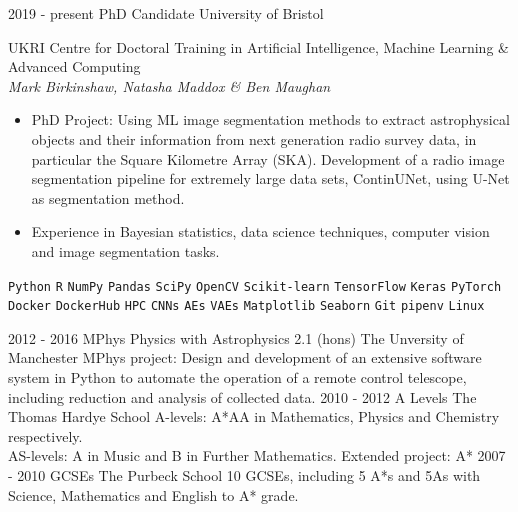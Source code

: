 \documentclass[9pt]{developercv} %
\begin{document}
\vspace{-10 pt}
\begin{entrylist}
    \entry
		{2019 - present}
		{PhD Candidate}
		{University of Bristol}
		{UKRI Centre for Doctoral Training in Artificial                                Intelligence, Machine Learning \& Advanced Computing \\
            \textnormal{\textit{Mark Birkinshaw, Natasha Maddox \& Ben Maughan}}
        \begin{itemize}[noitemsep,topsep=0pt,parsep=0pt,partopsep=0pt, leftmargin=-1pt]
            \item PhD Project: Using ML image segmentation methods to extract astrophysical objects and their information from next generation radio survey data, in particular the Square Kilometre Array (SKA). Development of a radio image segmentation pipeline for extremely large data sets, ContinUNet, using U-Net as segmentation method.
            \item Experience in Bayesian statistics, data science techniques, computer vision and image segmentation tasks.
        \end{itemize} 
        \texttt{Python} \slashsep \texttt{R} \slashsep \texttt{NumPy} \slashsep \texttt{Pandas} \slashsep \texttt{SciPy} \slashsep \texttt{OpenCV} \slashsep \texttt{Scikit-learn} \slashsep \texttt{TensorFlow} \slashsep \texttt{Keras} \slashsep \texttt{PyTorch} \slashsep \texttt{Docker} \slashsep \texttt{DockerHub} \slashsep \texttt{HPC} \slashsep \texttt{CNNs} \slashsep \texttt{AEs} \slashsep \texttt{VAEs} \slashsep \texttt{Matplotlib} \slashsep \texttt{Seaborn} \slashsep \texttt{Git} \slashsep \texttt{pipenv} \slashsep \texttt{Linux}}
    \entry
		{2012 - 2016}
		{MPhys Physics with Astrophysics 2.1 (hons)}
		{The Unversity of Manchester}
		{MPhys project: Design and development of an extensive software system in         Python to automate the operation of a remote control telescope, including         reduction and analysis of collected data.}
    \entry
		{2010 - 2012}
		{A Levels}
		{The Thomas Hardye School}
		{A-levels: A*AA in Mathematics, Physics and Chemistry respectively.\\
            AS-levels: A in Music and B in Further Mathematics. Extended project: A*
            }
	\entry
		{2007 - 2010}
		{GCSEs}
		{The Purbeck School}
		{10 GCSEs, including 5 A*s and 5As with Science, Mathematics and English to       A* grade.}
\end{entrylist}
\end{document}
